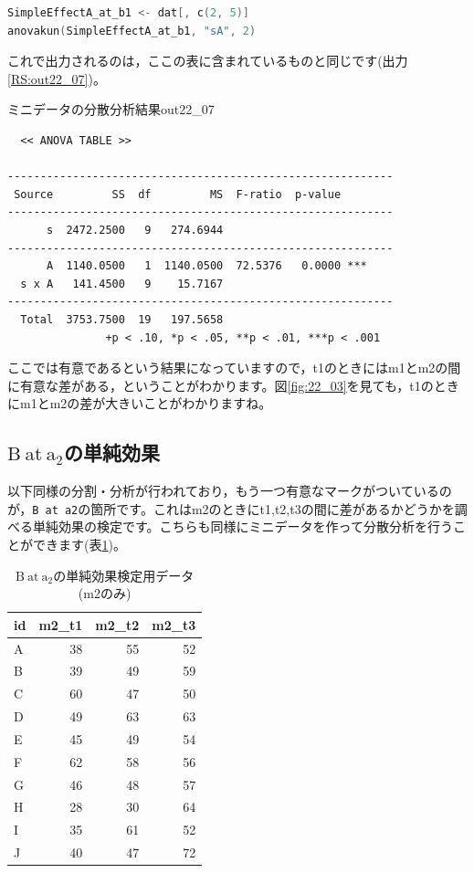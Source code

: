 \documentclass{ltjbook}
\begin{document}
\begin{lstlisting}[language=c++,label={code:22_05},caption={A at b1の単純効果検定}]
SimpleEffectA_at_b1 <- dat[, c(2, 5)]
anovakun(SimpleEffectA_at_b1, "sA", 2)
\end{lstlisting}
これで出力されるのは，ここの表に含まれているものと同じです(出力\ref{RS:out22_07})。

\begin{Rscreen}{ミニデータの分散分析結果}{out22_07}
\begin{verbatim}
  << ANOVA TABLE >>

-----------------------------------------------------------
 Source         SS  df         MS  F-ratio  p-value      
-----------------------------------------------------------
      s  2472.2500   9   274.6944                        
-----------------------------------------------------------
      A  1140.0500   1  1140.0500  72.5376   0.0000 ***  
  s x A   141.4500   9    15.7167                        
-----------------------------------------------------------
  Total  3753.7500  19   197.5658                        
               +p < .10, *p < .05, **p < .01, ***p < .001
\end{verbatim}
\end{Rscreen}

ここでは有意であるという結果になっていますので，t1のときにはm1とm2の間に有意な差がある，ということがわかります。図\ref{fig:22_03}を見ても，t1のときにm1とm2の差が大きいことがわかりますね。

\subsection{$\mathrm{B}\ \mathrm{at}\ \mathrm{a}_2$の単純効果}

以下同様の分割・分析が行われており，もう一つ有意なマークがついているのが，\verb|B at a2|の箇所です。これはm2のときにt1,t2,t3の間に差があるかどうかを調べる単純効果の検定です。こちらも同様にミニデータを作って分散分析を行うことができます(表\ref{tbl:22_03})。

\begin{table}[ht]
\centering
	\caption{$\mathrm{B}\ \mathrm{at}\ \mathrm{a}_2$の単純効果検定用データ(m2のみ)}
	\label{tbl:22_03}
\begin{tabular}{lrrr}
  \hline
id & m2\_t1 & m2\_t2 & m2\_t3 \\
  \hline
A & 38 & 55 & 52 \\
B & 39 & 49 & 59 \\
C & 60 & 47 & 50 \\
D & 49 & 63 & 63 \\
E & 45 & 49 & 54 \\
F & 62 & 58 & 56 \\
G & 46 & 48 & 57 \\
H & 28 & 30 & 64 \\
I & 35 & 61 & 52 \\
J & 40 & 47 & 72 \\
  \hline
\end{tabular}
\end{table}
\end{document}

